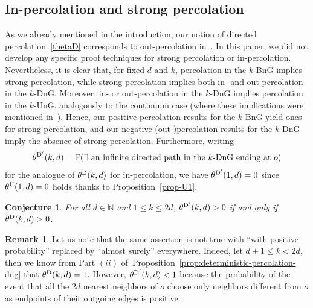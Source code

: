 \documentclass[a4paper, oneside, 11pt]{amsart}
\newcommand{\N}{\mathbb{N}}
\newtheorem{conj}[theorem]{Conjecture}
\theoremstyle{definition}
\newtheorem{remark}[theorem]{Remark}
\renewcommand{\P}{\mathbb{P}}
\newcommand{\1}{\mathbbm{1}}
\newcommand{\0}{\mathbf{o}}
\numberwithin{equation}{section}
\begin{document}
\subsection{In-percolation and strong percolation}\label{sec-instrong}
As we already mentioned in the introduction, our notion of directed percolation~\eqref{thetaD} corresponds to out-percolation in~\cite{BalisterBollobas13}. 
In this paper, we did not develop any specific proof techniques for strong percolation or in-percolation. Nevertheless, it is clear that, for fixed $d$ and $k$, percolation in the $k$-BnG implies strong percolation, while strong percolation implies both in- and out-percolation in the $k$-DnG. Moreover, in- or out-percolation in the $k$-DnG implies percolation in the $k$-UnG, analogously to the continuum case (where these implications were mentioned in~\cite{BalisterBollobas13}). Hence, our positive percolation results for the $k$-BnG yield ones for strong percolation, and our negative (out-)percolation results for the $k$-DnG imply the absence of strong percolation. Furthermore, writing
\[ \theta^{\rm D'}(k,d) = \P(\exists \text{ an infinite directed path in the $k$-DnG ending at }o) \] 
for the analogue of $\theta^{\rm D}(k,d)$ for in-percolation, we have $\theta^{\rm D'}(1,d)=0$ since $\theta^{\rm U}(1,d)=0$ holds thanks to Proposition~\ref{prop-U1}.
\begin{conj}\label{conj:in}
    For all $d \in \N$  and $1 \leq k \leq 2d$, $\theta^{\rm D'}(k,d)>0$ if and only if $\theta^{\rm D}(k,d)>0$.
\end{conj}
\begin{remark}
Let us note that the same assertion is not true with ``with positive probability'' replaced by ``almost surely'' everywhere. Indeed, let $d+1 \leq k<2d$, then we know from Part $(ii)$ of~Proposition~\ref{prop:deterministic-percolation-dng} that $\theta^{\rm D}(k,d) =1$. However, $\theta^{\rm D'}(k,d)<1$ because the probability of the event that all the $2d$ nearest neighbors of $o$ choose only neighbors different from $o$ as endpoints of their outgoing edges is positive. 
\end{remark}
\end{document}
